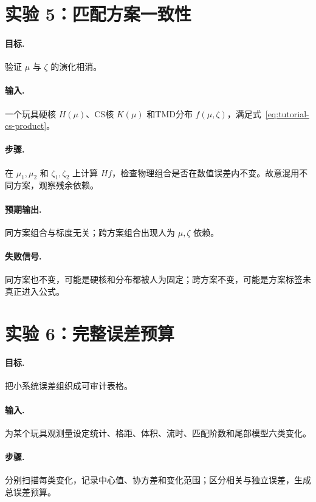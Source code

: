 \documentclass[UTF8,12pt,a4paper,twoside,openany]{ctexbook}
\begin{document}
\section{实验 5：匹配方案一致性}

\paragraph{目标.} 验证 \(\mu\) 与 \(\zeta\) 的演化相消。

\paragraph{输入.} 一个玩具硬核 \(H(\mu)\)、CS核 \(K(\mu)\) 和TMD分布 \(f(\mu,\zeta)\)，满足式~\eqref{eq:tutorial-cs-product}。

\paragraph{步骤.} 在 \(\mu_1,\mu_2\) 和 \(\zeta_1,\zeta_2\) 上计算 \(Hf\)，检查物理组合是否在数值误差内不变。故意混用不同方案，观察残余依赖。

\paragraph{预期输出.} 同方案组合与标度无关；跨方案组合出现人为 \(\mu,\zeta\) 依赖。

\paragraph{失败信号.} 同方案也不变，可能是硬核和分布都被人为固定；跨方案不变，可能是方案标签未真正进入公式。

\section{实验 6：完整误差预算}

\paragraph{目标.} 把小系统误差组织成可审计表格。

\paragraph{输入.} 为某个玩具观测量设定统计、格距、体积、流时、匹配阶数和尾部模型六类变化。

\paragraph{步骤.} 分别扫描每类变化，记录中心值、协方差和变化范围；区分相关与独立误差，生成总误差预算。
\end{document}
